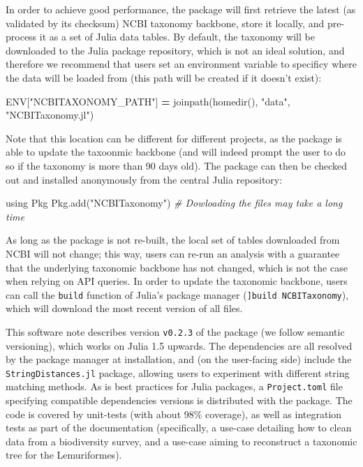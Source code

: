 \documentclass[11pt]{article}
\newenvironment{Shaded}{\begin{snugshade}}{\end{snugshade}}
\newcommand{\ConstantTok}[1]{\textcolor[rgb]{0.00,0.00,0.00}{#1}}
\newcommand{\StringTok}[1]{\textcolor[rgb]{0.31,0.60,0.02}{#1}}
\newcommand{\ImportTok}[1]{#1}
\newcommand{\CommentTok}[1]{\textcolor[rgb]{0.56,0.35,0.01}{\textit{#1}}}
\newcommand{\FunctionTok}[1]{\textcolor[rgb]{0.00,0.00,0.00}{#1}}
\newcommand{\OperatorTok}[1]{\textcolor[rgb]{0.81,0.36,0.00}{\textbf{#1}}}
\newcommand{\BuiltInTok}[1]{#1}
\newcommand{\NormalTok}[1]{#1}
\begin{document}
In order to achieve good performance, the package will first retrieve
the latest (as validated by its checksum) NCBI taxonomy backbone, store
it locally, and pre-process it as a set of Julia data tables. By
default, the taxonomy will be downloaded to the Julia package
repository, which is not an ideal solution, and therefore we recommend
that users set an environment variable to specificy where the data will
be loaded from (this path will be created if it doesn't exist):

\begin{Shaded}
\begin{Highlighting}[]
\ConstantTok{ENV}\NormalTok{[}\StringTok{"NCBITAXONOMY\_PATH"}\NormalTok{] }\OperatorTok{=} \FunctionTok{joinpath}\NormalTok{(}\FunctionTok{homedir}\NormalTok{(), }\StringTok{"data"}\NormalTok{, }\StringTok{"NCBITaxonomy.jl"}\NormalTok{)}
\end{Highlighting}
\end{Shaded}

Note that this location can be different for different projects, as the
package is able to update the taxoonmic backbone (and will indeed prompt
the user to do so if the taxonomy is more than 90 days old). The package
can then be checked out and installed anonymously from the central Julia
repository:

\begin{Shaded}
\begin{Highlighting}[]
\ImportTok{using} \BuiltInTok{Pkg}
\BuiltInTok{Pkg}\NormalTok{.}\FunctionTok{add}\NormalTok{(}\StringTok{"NCBITaxonomy"}\NormalTok{) }\CommentTok{\# Dowloading the files may take a long time}
\end{Highlighting}
\end{Shaded}

As long as the package is not re-built, the local set of tables
downloaded from NCBI will not change; this way, users can re-run an
analysis with a guarantee that the underlying taxonomic backbone has not
changed, which is not the case when relying on API queries. In order to
update the taxonomic backbone, users can call the \texttt{build}
function of Julia's package manager (\texttt{{]}build\ NCBITaxonomy}),
which will download the most recent version of all files.

This software note describes version \texttt{v0.2.3} of the package (we
follow semantic versioning), which works on Julia 1.5 upwards. The
dependencies are all resolved by the package manager at installation,
and (on the user-facing side) include the \texttt{StringDistances.jl}
package, allowing users to experiment with different string matching
methods. As is best practices for Julia packages, a
\texttt{Project.toml} file specifying compatible dependencies versions
is distributed with the package. The code is covered by unit-tests (with
about 98\% coverage), as well as integration tests as part of the
documentation (specifically, a use-case detailing how to clean data from
a biodiversity survey, and a use-case aiming to reconstruct a taxonomic
tree for the Lemuriformes).
\end{document}
